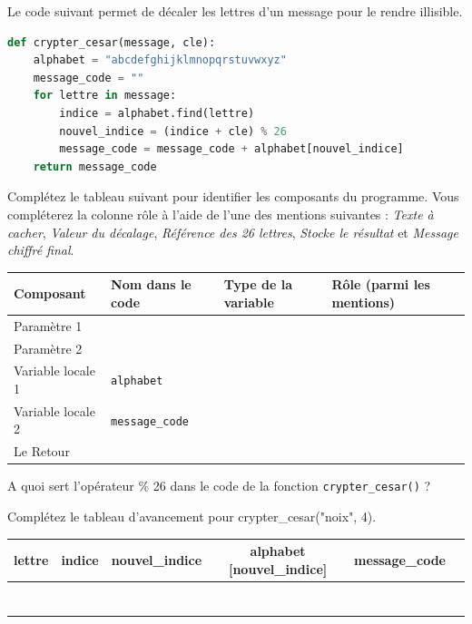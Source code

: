 \begin{Exercise}[title={Analyse du protocole de César}]

Le code suivant permet de décaler les lettres d'un message pour le rendre illisible.

\begin{lstlisting}[style=pythonstyle, language=python]
def crypter_cesar(message, cle):
    alphabet = "abcdefghijklmnopqrstuvwxyz"
    message_code = ""
    for lettre in message:
        indice = alphabet.find(lettre)
        nouvel_indice = (indice + cle) % 26
        message_code = message_code + alphabet[nouvel_indice]
    return message_code
\end{lstlisting}

\Question Complétez le tableau suivant pour identifier les composants du programme. Vous compléterez la colonne rôle à l'aide de l'une des mentions suivantes : \textit{Texte à cacher}, \textit{Valeur du décalage}, \textit{Référence des 26 lettres}, \textit{Stocke le résultat} et \textit{Message chiffré final}.

\begin{center}
\begin{tabular}{|l|l|l|l|}
\hline
\textbf{Composant} & \textbf{Nom dans le code} & \textbf{Type de la variable} & \textbf{Rôle (parmi les mentions)} \\ \hline
Paramètre 1 & & &  \\ \hline
Paramètre 2 & & &  \\ \hline
Variable locale 1 & \texttt{alphabet} & &  \\ \hline
Variable locale 2 & \texttt{message\_code} & &  \\ \hline
Le Retour & & &  \\ \hline
\end{tabular}
\end{center}

\Question A quoi sert l'opérateur \textsc{\% 26} dans le code de la fonction \texttt{crypter\_cesar()} ? \\
\emptybox{1.5cm}

\Question Complétez le tableau d'avancement pour crypter\_cesar("noix", 4).\\
\begin{center}
    \large
\begin{tabular}{c|c|c|c|c|c}
\textbf{lettre} & \textbf{indice} & \textbf{nouvel\_indice} & \textbf{alphabet [nouvel\_indice]} &  \textbf{message\_code}\\
\hline
&  &  & &\\
&  &  & &\\
&  &  & &\\
&  &  & &\\
&  &  & &\\
&  &  & &\\
&  &  & &\\
\end{tabular}
\end{center}


\end{Exercise}
